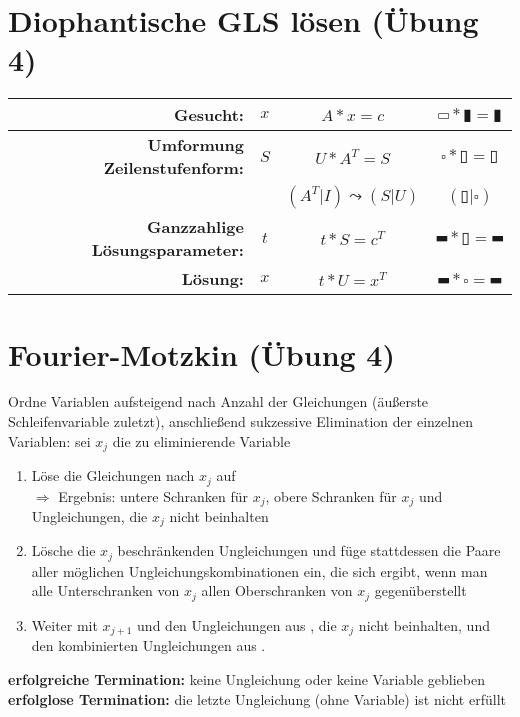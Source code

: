 \documentclass[a4paper,10pt]{article}
\begin{document}
% 

\section{Diophantische GLS lösen (Übung 4)}
\begin{center}
\begin{tabular}{rc|c|c}
\textbf{Gesucht:}                      & $x$   & $A * x = c$              & $\hrectangle * \vrectangleblack = \vrectangleblack$ \\
\hline
\textbf{Umformung Zeilenstufenform:}   & $S$   & $U * A^T = S$            & $\square * \vrectangle = \vrectangle$\\
                                       &       & $(A^T|I) \leadsto (S|U)$ & $(\vrectangle | \square)$ \\
\hline
\textbf{Ganzzahlige Lösungsparameter:} & $t$   & $t * S = c^T$            & $\hrectangleblack * \vrectangle = \hrectangleblack$ \\
\hline
\textbf{Lösung:}                       & $x$   & $t * U = x^T$              & $\hrectangleblack * \square = \hrectangleblack$ \\
\end{tabular}
\end{center}


\section{Fourier-Motzkin (Übung 4)}
Ordne Variablen aufsteigend nach Anzahl der Gleichungen (äußerste Schleifenvariable zuletzt),
anschließend sukzessive Elimination der einzelnen Variablen: sei $x_j$ die zu eliminierende Variable
\begin{enumerate}
	\item \label{itm:fm-aufl} Löse die Gleichungen nach $x_j$ auf\\
		$\Rightarrow$ Ergebnis: untere Schranken für $x_j$, obere Schranken für $x_j$ und Ungleichungen, die $x_j$ nicht beinhalten
	\item \label{itm:fm-elim} Lösche die $x_j$ beschränkenden Ungleichungen und füge stattdessen die Paare aller möglichen Ungleichungskombinationen ein, die sich ergibt, wenn man alle Unterschranken von $x_j$ allen Oberschranken von $x_j$ gegenüberstellt
	\item Weiter mit $x_{j+1}$ und den Ungleichungen aus , die $x_j$ nicht beinhalten, und den kombinierten Ungleichungen aus .
\end{enumerate}
\textbf{erfolgreiche Termination:} keine Ungleichung oder keine Variable geblieben\\
\textbf{erfolglose Termination:} die letzte Ungleichung (ohne Variable) ist nicht erfüllt
\end{document}
